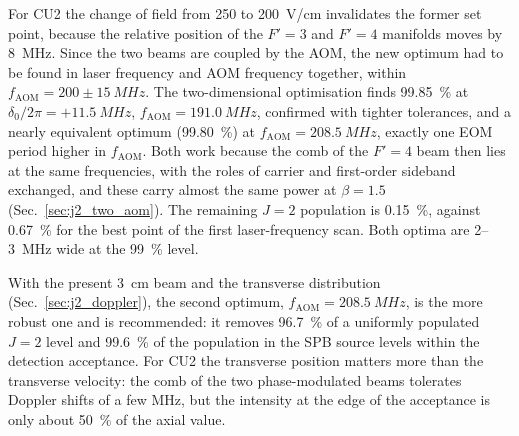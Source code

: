 \documentclass[11pt,a4paper,oneside]{report}
\newcommand{\fAOM}{f_{\mathrm{AOM}}}
\begin{document}
For CU2 the change of field from 250 to \SI{200}{V/cm} invalidates the former set point,
because the relative position of the $F'=3$ and $F'=4$ manifolds moves by \SI{8}{MHz}. Since
the two beams are coupled by the AOM, the new optimum had to be found in laser frequency and AOM
frequency together, within $\fAOM=200\pm\SI{15}{MHz}$. The two-dimensional optimisation finds
\SI{99.85}{\percent} at $\delta_0/2\pi=+\SI{11.5}{MHz}$, $\fAOM=\SI{191.0}{MHz}$, confirmed with
tighter tolerances, and a nearly equivalent optimum (\SI{99.80}{\percent}) at
$\fAOM=\SI{208.5}{MHz}$, exactly one EOM period higher in $\fAOM$. Both work because the
comb of the $F'=4$ beam then lies at the same frequencies, with the roles of carrier and
first-order sideband exchanged, and these carry almost the same power at $\beta=1.5$
(Sec.~\ref{sec:j2_two_aom}). The remaining $J=2$
population is \SI{0.15}{\percent}, against \SI{0.67}{\percent} for the best point of the first
laser-frequency scan. Both optima are 2--\SI{3}{MHz} wide at the \SI{99}{\percent} level.

With the present \SI{3}{cm} beam and the transverse distribution (Sec.~\ref{sec:j2_doppler}),
the second optimum, $\fAOM=\SI{208.5}{MHz}$, is the more robust one and is recommended: it removes
\SI{96.7}{\percent} of a uniformly populated $J=2$ level and \SI{99.6}{\percent} of the population
in the SPB source levels within the detection acceptance. For CU2 the transverse position matters
more than the transverse velocity: the comb of the two phase-modulated beams tolerates Doppler
shifts of a few MHz, but the intensity at the edge of the acceptance is only about
\SI{50}{\percent} of the axial value.
\end{document}
